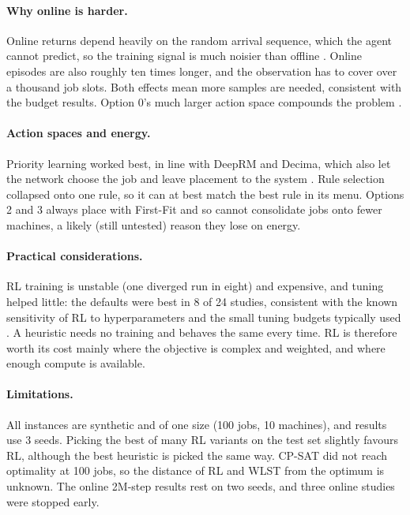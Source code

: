 \documentclass[12pt]{article}
\begin{document}
\paragraph{Why online is harder.} Online returns depend heavily on the random arrival sequence, which the agent cannot predict, so the training signal is much noisier than offline \cite{mao2019variance}. Online episodes are also roughly ten times longer, and the observation has to cover over a thousand job slots. Both effects mean more samples are needed, consistent with the budget results. Option 0's much larger action space compounds the problem \cite{dulacarnold2015largeactionspaces}.

\paragraph{Action spaces and energy.} Priority learning worked best, in line with DeepRM and Decima, which also let the network choose the job and leave placement to the system \cite{mao2016deeprm, mao2019decima}. Rule selection collapsed onto one rule, so it can at best match the best rule in its menu. Options 2 and 3 always place with First-Fit and so cannot consolidate jobs onto fewer machines, a likely (still untested) reason they lose on energy.

\paragraph{Practical considerations.} RL training is unstable (one diverged run in eight) and expensive, and tuning helped little: the defaults were best in 8 of 24 studies, consistent with the known sensitivity of RL to hyperparameters and the small tuning budgets typically used \cite{eimer2023hyperparams}. A heuristic needs no training and behaves the same every time. RL is therefore worth its cost mainly where the objective is complex and weighted, and where enough compute is available.

\paragraph{Limitations.} All instances are synthetic and of one size (100 jobs, 10 machines), and results use 3 seeds. Picking the best of many RL variants on the test set slightly favours RL, although the best heuristic is picked the same way. CP-SAT did not reach optimality at 100 jobs, so the distance of RL and WLST from the optimum is unknown. The online 2M-step results rest on two seeds, and three online studies were stopped early.
\end{document}
